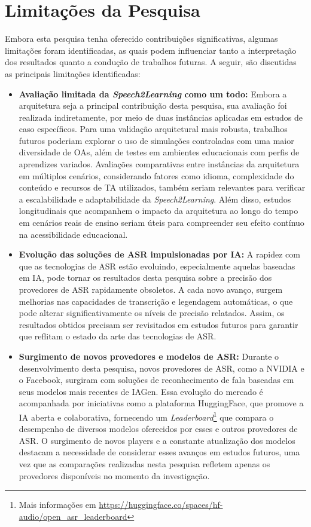 \section{Limitações da Pesquisa}

Embora esta pesquisa tenha oferecido contribuições significativas, algumas limitações foram identificadas, as quais podem influenciar tanto a interpretação dos resultados quanto a condução de trabalhos futuras. A seguir, são discutidas as principais limitações identificadas:

\begin{itemize}

\item \textbf{Avaliação limitada da \textit{Speech2Learning} como um todo:} Embora a arquitetura seja a principal contribuição desta pesquisa, sua avaliação foi realizada indiretamente, por meio de duas instâncias aplicadas em estudos de caso específicos. Para uma validação arquitetural mais robusta,  trabalhos futuros poderiam explorar o uso de simulações controladas com uma maior diversidade de OAs, além de testes em ambientes educacionais com perfis de aprendizes variados. Avaliações comparativas entre instâncias da arquitetura em múltiplos cenários, considerando fatores como idioma, complexidade do conteúdo e recursos de TA utilizados, também seriam relevantes para verificar a escalabilidade e adaptabilidade da \textit{Speech2Learning}. Além disso, estudos longitudinais que acompanhem o impacto da arquitetura ao longo do tempo em cenários reais de ensino seriam úteis para compreender seu efeito contínuo na acessibilidade educacional.

\item \textbf{Evolução das soluções de ASR impulsionadas por IA:} A rapidez com que as tecnologias de ASR estão evoluindo, especialmente aquelas baseadas em IA, pode tornar os resultados desta pesquisa sobre a precisão dos provedores de ASR rapidamente obsoletos. A cada novo avanço, surgem melhorias nas capacidades de transcrição e legendagem automáticas, o que pode alterar significativamente os níveis de precisão relatados. Assim, os resultados obtidos precisam ser revisitados em estudos futuros para garantir que reflitam o estado da arte das tecnologias de ASR.

\item \textbf{Surgimento de novos provedores e modelos de ASR:} Durante o desenvolvimento desta pesquisa, novos provedores de ASR, como a NVIDIA e o Facebook, surgiram com soluções de reconhecimento de fala baseadas em seus modelos mais recentes de IAGen. Essa evolução do mercado é acompanhada por iniciativas como a plataforma HuggingFace, que promove a IA aberta e colaborativa, fornecendo um \textit{Leaderboard}\footnote{Mais informações em \url{https://huggingface.co/spaces/hf-audio/open_asr_leaderboard}} que compara o desempenho de diversos modelos oferecidos por esses e outros provedores de ASR. O surgimento de novos players e a constante atualização dos modelos destacam a necessidade de considerar esses avanços em estudos futuros, uma vez que as comparações realizadas nesta pesquisa refletem apenas os provedores disponíveis no momento da investigação.


\end{itemize}
